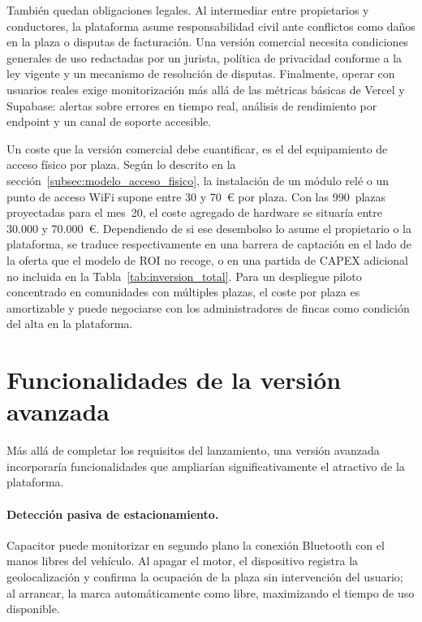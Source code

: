 También quedan obligaciones legales. Al intermediar entre propietarios y conductores, la plataforma asume responsabilidad civil ante conflictos como daños en la plaza o disputas de facturación. Una versión comercial necesita condiciones generales de uso redactadas por un jurista, política de privacidad conforme a la ley vigente y un mecanismo de resolución de disputas. Finalmente, operar con usuarios reales exige monitorización más allá de las métricas básicas de Vercel y Supabase: alertas sobre errores en tiempo real, análisis de rendimiento por endpoint y un canal de soporte accesible.

Un coste que la versión comercial debe cuantificar, es el del equipamiento de acceso físico por plaza. Según lo descrito en la sección~\ref{subsec:modelo_acceso_fisico}, la instalación de un módulo relé o un punto de acceso WiFi supone entre 30 y 70~€ por plaza. Con las 990~plazas proyectadas para el mes~20, el coste agregado de hardware se situaría entre 30.000 y 70.000~€. Dependiendo de si ese desembolso lo asume el propietario o la plataforma, se traduce respectivamente en una barrera de captación en el lado de la oferta que el modelo de ROI no recoge, o en una partida de CAPEX adicional no incluida en la Tabla~\ref{tab:inversion_total}. Para un despliegue piloto concentrado en comunidades con múltiples plazas, el coste por plaza es amortizable y puede negociarse con los administradores de fincas como condición del alta en la plataforma.

\section{Funcionalidades de la versión avanzada}
\label{sec:funcionalidades_adicionales}

Más allá de completar los requisitos del lanzamiento, una versión avanzada incorporaría funcionalidades que ampliarían significativamente el atractivo de la plataforma.

\paragraph{Detección pasiva de estacionamiento.} Capacitor puede monitorizar en segundo plano la conexión Bluetooth con el manos libres del vehículo. Al apagar el motor, el dispositivo registra la geolocalización y confirma la ocupación de la plaza sin intervención del usuario; al arrancar, la marca automáticamente como libre, maximizando el tiempo de uso disponible.


